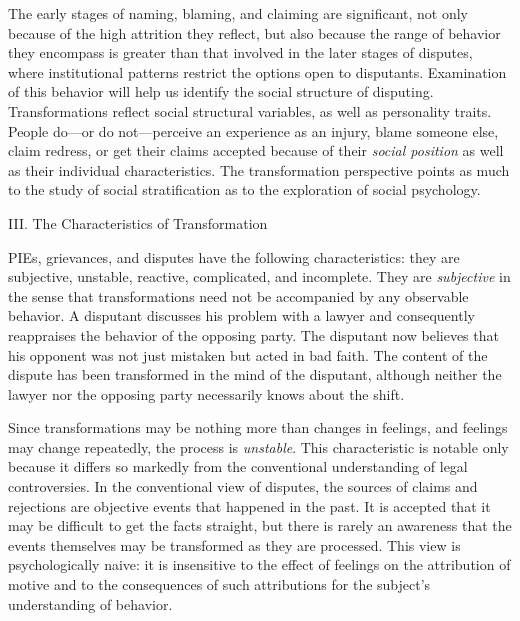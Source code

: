 \documentclass[11pt,letterpaper,twoside]{article}
\begin{document}
The early stages of naming, blaming, and claiming are significant, not
only because of the high attrition they reflect, but also because the
range of behavior they encompass is greater than that involved in the
later stages of disputes, where institutional patterns restrict the
options open to disputants. Examination of this behavior will help us
identify the social structure of disputing. Transformations reflect
social structural variables, as well as personality traits. People
do---or do not---perceive an experience as an injury, blame someone
else, claim redress, or get their claims accepted because of their
\emph{social position} as well as their individual characteristics. The
transformation perspective points as much to the study of social
stratification as to the exploration of social psychology.

{III. The Characteristics of Transformation}

PIEs, grievances, and disputes have the following characteristics: they
are subjective, unstable, reactive, complicated, and incomplete. They
are \emph{subjective} in the sense that transformations need not be
accompanied by any observable behavior. A disputant discusses his
problem with a lawyer and consequently reappraises the behavior of the
opposing party. The disputant now believes that his opponent was not
just mistaken but acted in bad faith. The content of the dispute has
been transformed in the mind of the disputant, although neither the
lawyer nor the opposing party necessarily knows about the shift.

Since transformations may be nothing more than changes in feelings, and
feelings may change repeatedly, the process is \emph{unstable}. This
characteristic is notable only because it differs so markedly from the
conventional understanding of legal controversies. In the conventional
view of disputes, the sources of claims and rejections are objective
events that happened in the past. It is accepted that it may be
difficult to get the facts straight, but there is rarely an awareness
that the events themselves may be transformed as they are processed.
This view is psychologically naive: it is insensitive to the effect of
feelings on the attribution of motive and to the consequences of such
attributions for the subject's understanding of behavior.
\end{document}
